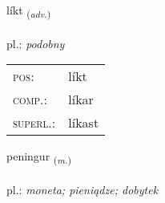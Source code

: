 \documentclass[frontgrid, backgrid]{flacards}\usepackage[]{graphicx}\usepackage[]{xcolor}
\begin{document}
\renewcommand{\flhead}{\vskip5pt \fboxsep=0pt {\small\bfseries\footnotesize Atviksorð | Adverb}}
\renewcommand{\fcfoot}{\vskip5pt \fboxsep=0pt \hspace{2pt}{\small\bfseries\footnotesize 1K}}

\renewcommand{\blhead}{\vskip5pt {\small\bfseries\footnotesize Atviksorð | Adverb }}
\renewcommand{\bcfoot}{\vskip5pt \hspace{2pt}{\small\bfseries\footnotesize 1K}}


{líkt \small{\textsubscript{(\textit{adv.})}} \\[1ex] %
\textphonetic{[lixt]} \\
pl.: \emph{podobny} \\  [2ex]
\renewcommand*{\arraystretch}{0.8}
\begin{tabular}{ll}
\textsc{pos}: & líkt \\ 
\textsc{comp.}: & líkar \\ 
\textsc{superl.}: & líkast \\
\end{tabular}
}

\renewcommand{\flhead}{\vskip5pt \fboxsep=0pt {\small\bfseries\footnotesize Nafnorð | Noun}}
\renewcommand{\fcfoot}{\vskip5pt \fboxsep=0pt \hspace{2pt}{\small\bfseries\footnotesize 1K}}

\renewcommand{\blhead}{\vskip5pt {\small\bfseries\footnotesize Nafnorð | Noun }}
\renewcommand{\bcfoot}{\vskip5pt \hspace{2pt}{\small\bfseries\footnotesize 1K}}


{peningur \small{\textsubscript{(\textit{m.})}} \\[1ex] %
\textphonetic{[pʰɛːniŋkʏr]} \\
pl.: \emph{moneta; pieniądze; dobytek} \\  [2ex]
\renewcommand*{\arraystretch}{0.8}
}
\end{document}
